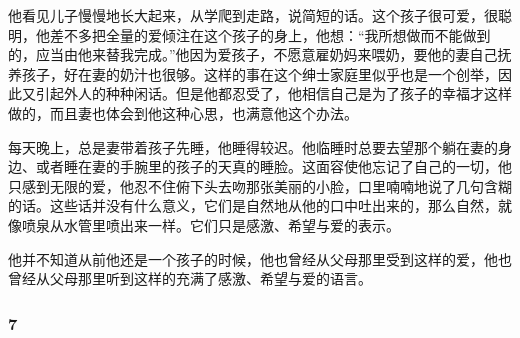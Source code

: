\par 他看见儿子慢慢地长大起来，从学爬到走路，说简短的话。这个孩子很可爱，很聪明，他差不多把全量的爱倾注在这个孩子的身上，他想：“我所想做而不能做到的，应当由他来替我完成。”他因为爱孩子，不愿意雇奶妈来喂奶，要他的妻自己抚养孩子，好在妻的奶汁也很够。这样的事在这个绅士家庭里似乎也是一个创举，因此又引起外人的种种闲话。但是他都忍受了，他相信自己是为了孩子的幸福才这样做的，而且妻也体会到他这种心思，也满意他这个办法。
\par 每天晚上，总是妻带着孩子先睡，他睡得较迟。他临睡时总要去望那个躺在妻的身边、或者睡在妻的手腕里的孩子的天真的睡脸。这面容使他忘记了自己的一切，他只感到无限的爱，他忍不住俯下头去吻那张美丽的小脸，口里喃喃地说了几句含糊的话。这些话并没有什么意义，它们是自然地从他的口中吐出来的，那么自然，就像喷泉从水管里喷出来一样。它们只是感激、希望与爱的表示。
\par 他并不知道从前他还是一个孩子的时候，他也曾经从父母那里受到这样的爱，他也曾经从父母那里听到这样的充满了感激、希望与爱的语言。



\subsubsection*{7}

